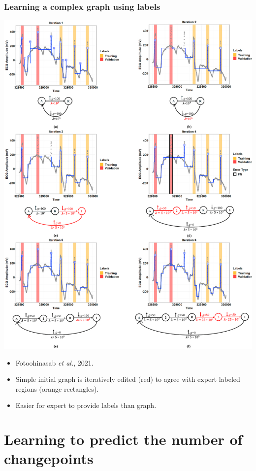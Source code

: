 \documentclass{beamer}
\begin{document}
\begin{frame}
  \frametitle{Learning a complex graph using labels}
\parbox{0.6\textwidth}{
  \includegraphics[width=\linewidth]{gfpop-ecg-iterations}
} \parbox{0.35\textwidth}{
  \begin{itemize}
  \item  Fotoohinasab \emph{et al.}, 2021.
\item Simple initial graph is iteratively edited (red) to agree with expert
 labeled regions (orange rectangles).
\item Easier for expert to provide labels than graph.
  \end{itemize}
 }
\end{frame}

\section{Learning to predict the number of changepoints}
\end{document}
